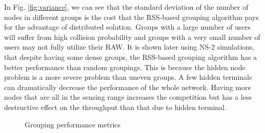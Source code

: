 In Fig. \ref{fig:variance}, we can see that the standard deviation of the number of nodes in different groups is the cost that the RSS-based grouping algorithm pays for the advantage of distributed solution. Groups with a large number of users will suffer from high collision probability and groups with a very small number of users may not fully utilize their RAW. It is shown later using NS-2 simulations, that despite having some dense groups, the RSS-based grouping algorithm has a better performance than random groupings. This is because the hidden node problem is a more severe problem than uneven groups. A few hidden terminals can dramatically decrease the performance of the whole network. Having more nodes that are all in the sensing range increases the competition but has a less destructive effect on the throughput than that due to hidden terminal.



\begin{figure}
  \centering
  \caption{Grouping performance metrics}
  \label{fig:metricx}
\end{figure}

